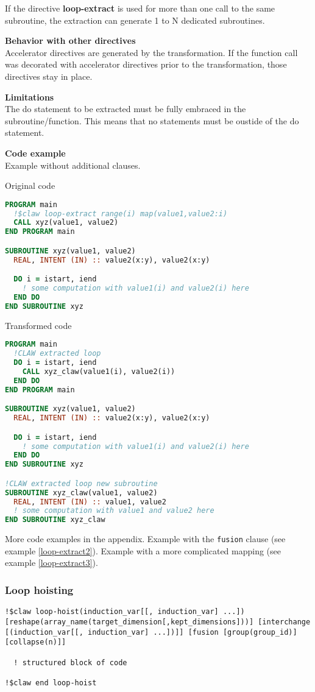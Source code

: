 If the directive \textbf{loop-extract} is used for more than one call to the
same subroutine, the extraction can generate 1 to N dedicated subroutines.

\textbf{Behavior with other directives}\\
Accelerator directives are generated by the transformation. If the function call
was decorated with accelerator directives prior to the transformation, those
directives stay in place.

\textbf{Limitations}\\
The do statement to be extracted must be fully embraced in the
subroutine/function. This means that no statements must be oustide of the do
statement.

\textbf{Code example}\\
\label{loop-extract1}
Example without additional clauses.

Original code
\begin{lstlisting}[language=Fortran]
PROGRAM main
  !$claw loop-extract range(i) map(value1,value2:i)
  CALL xyz(value1, value2)
END PROGRAM main

SUBROUTINE xyz(value1, value2)
  REAL, INTENT (IN) :: value2(x:y), value2(x:y)

  DO i = istart, iend
    ! some computation with value1(i) and value2(i) here
  END DO
END SUBROUTINE xyz
\end{lstlisting}


Transformed code
\begin{lstlisting}[language=Fortran]
PROGRAM main
  !CLAW extracted loop
  DO i = istart, iend
    CALL xyz_claw(value1(i), value2(i))
  END DO
END PROGRAM main

SUBROUTINE xyz(value1, value2)
  REAL, INTENT (IN) :: value2(x:y), value2(x:y)

  DO i = istart, iend
    ! some computation with value1(i) and value2(i) here
  END DO
END SUBROUTINE xyz

!CLAW extracted loop new subroutine
SUBROUTINE xyz_claw(value1, value2)
  REAL, INTENT (IN) :: value1, value2
  ! some computation with value1 and value2 here
END SUBROUTINE xyz_claw
\end{lstlisting}

More code examples in the appendix. Example with the \lstinline!fusion! clause
(see example \ref{loop-extract2}). Example with a more complicated mapping
(see example \ref{loop-extract3}).

\subsubsection{Loop hoisting}
\begin{lstlisting}
!$claw loop-hoist(induction_var[[, induction_var] ...]) [reshape(array_name(target_dimension[,kept_dimensions]))] [interchange [(induction_var[[, induction_var] ...])]] [fusion [group(group_id)] [collapse(n)]]

  ! structured block of code

!$claw end loop-hoist
\end{lstlisting}

